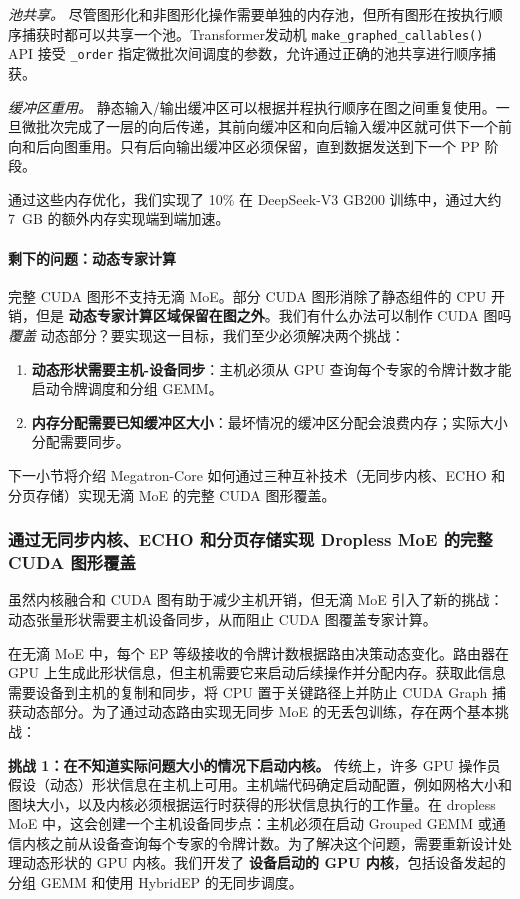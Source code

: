 \documentclass[10pt,logo,copyright]{nvidiatechreport_zh}
\begin{document}
\textit{池共享。}
尽管图形化和非图形化操作需要单独的内存池，但所有图形在按执行顺序捕获时都可以共享一个池。Transformer发动机 \texttt{make\_graphed\_callables()} API 接受 \texttt{\_order} 指定微批次间调度的参数，允许通过正确的池共享进行顺序捕获。

\textit{缓冲区重用。}
静态输入/输出缓冲区可以根据并程执行顺序在图之间重复使用。一旦微批次完成了一层的向后传递，其前向缓冲区和向后输入缓冲区就可供下一个前向和后向图重用。只有后向输出缓冲区必须保留，直到数据发送到下一个 PP 阶段。

通过这些内存优化，我们实现了 10\% 在 DeepSeek-V3 GB200 训练中，通过大约 7~GB 的额外内存实现端到端加速。

\paragraph{剩下的问题：动态专家计算}

完整 CUDA 图形不支持无滴 MoE。部分 CUDA 图形消除了静态组件的 CPU 开销，但是 \textbf{动态专家计算区域保留在图之外}。我们有什么办法可以制作 CUDA 图吗 \textit{覆盖} 动态部分？要实现这一目标，我们至少必须解决两个挑战：
\begin{enumerate}
    \item \textbf{动态形状需要主机-设备同步}：主机必须从 GPU 查询每个专家的令牌计数才能启动令牌调度和分组 GEMM。
    \item \textbf{内存分配需要已知缓冲区大小}：最坏情况的缓冲区分配会浪费内存；实际大小分配需要同步。
\end{enumerate}

下一小节将介绍 Megatron-Core 如何通过三种互补技术（无同步内核、ECHO 和分页存储）实现无滴 MoE 的完整 CUDA 图形覆盖。

\subsubsection{通过无同步内核、ECHO 和分页存储实现 Dropless MoE 的完整 CUDA 图形覆盖}\label{sec:sync-free-moe}

虽然内核融合和 CUDA 图有助于减少主机开销，但无滴 MoE 引入了新的挑战：动态张量形状需要主机设备同步，从而阻止 CUDA 图覆盖专家计算。

在无滴 MoE 中，每个 EP 等级接收的令牌计数根据路由决策动态变化。路由器在 GPU 上生成此形状信息，但主机需要它来启动后续操作并分配内存。获取此信息需要设备到主机的复制和同步，将 CPU 置于关键路径上并防止 CUDA Graph 捕获动态部分。为了通过动态路由实现无同步 MoE 的无丢包训练，存在两个基本挑战：

\textbf{挑战 1：在不知道实际问题大小的情况下启动内核。}
传统上，许多 GPU 操作员假设（动态）形状信息在主机上可用。主机端代码确定启动配置，例如网格大小和图块大小，以及内核必须根据运行时获得的形状信息执行的工作量。在 dropless MoE 中，这会创建一个主机设备同步点：主机必须在启动 Grouped GEMM 或通信内核之前从设备查询每个专家的令牌计数。为了解决这个问题，需要重新设计处理动态形状的 GPU 内核。我们开发了 \textbf{设备启动的 GPU 内核}，包括设备发起的分组 GEMM 和使用 HybridEP 的无同步调度。
\end{document}

